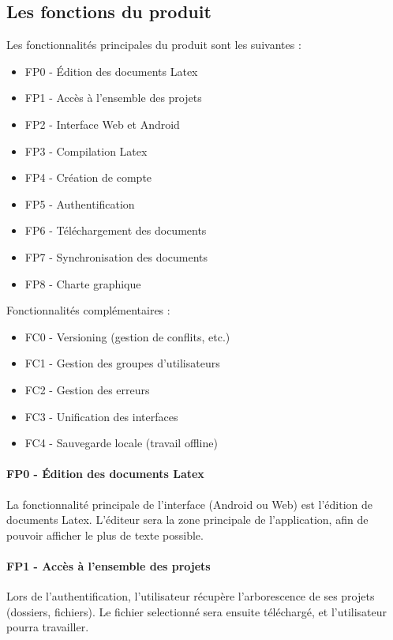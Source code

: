\documentclass[a4paper,12pt]{article}
\begin{document}
\subsection{Les fonctions du produit}
 	
Les fonctionnalités principales du produit sont les suivantes :\\

\begin{itemize}
 \item FP0 - \'Edition des documents Latex
 \item FP1 - Accès à l'ensemble des projets
 \item FP2 - Interface Web et Android
 \item FP3 - Compilation Latex
 \item FP4 - Création de compte
 \item FP5 - Authentification
 \item FP6 - Téléchargement des documents
 \item FP7 - Synchronisation des documents
 \item FP8 - Charte graphique
\end{itemize}
\bigskip
Fonctionnalités complémentaires :\\
\begin{itemize}
 \item FC0 - Versioning (gestion de conflits, etc.)
 \item FC1 - Gestion des groupes d'utilisateurs
 \item FC2 - Gestion des erreurs
 \item FC3 - Unification des interfaces
 \item FC4 - Sauvegarde locale (travail offline)
\end{itemize}

\paragraph{FP0 - \'Edition des documents Latex\\}
La fonctionnalité principale de l'interface (Android ou Web) est l'édition de documents Latex. 
L'éditeur sera la zone principale de l'application, afin de pouvoir afficher le plus de texte 
possible.

\paragraph{FP1 - Accès à l'ensemble des projets\\}
Lors de l'authentification, l'utilisateur récupère l'arborescence de ses projets (dossiers, 
fichiers). Le fichier selectionné sera ensuite téléchargé, et l'utilisateur pourra travailler.
\end{document}
